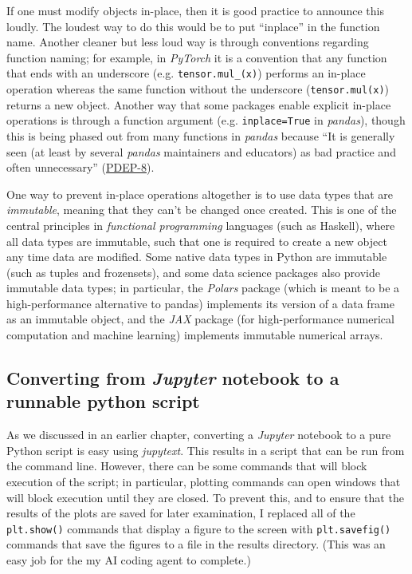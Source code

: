 If one must modify objects in-place, then it is good practice to announce this loudly.  The loudest way to do this would be to put ``inplace'' in the function name. Another cleaner but less loud way is through conventions regarding function naming; for example, in \textit{PyTorch} it is a convention that any function that ends with an underscore (e.g. \texttt{tensor.mul\_(x)}) performs an in-place operation whereas the same function without the underscore (\texttt{tensor.mul(x)}) returns a new object. Another way that some packages enable explicit in-place operations is through a function argument (e.g. \texttt{inplace=True} in \textit{pandas}), though this is being phased out from many functions in \textit{pandas} because ``It is generally seen (at least by several \textit{pandas} maintainers and educators) as bad practice and often unnecessary'' (\href{https://pandas.pydata.org/pdeps/0008-inplace-methods-in-pandas.html}{PDEP-8}).

One way to prevent in-place operations altogether is to use data types that are \textit{immutable}, meaning that they can't be changed once created.  This is one of the central principles in \textit{functional programming} languages (such as Haskell), where all data types are immutable, such that one is required to create a new object any time data are modified.  Some native data types in Python are immutable (such as tuples and frozensets), and some data science packages also provide immutable data types; in particular, the \textit{Polars} package (which is meant to be a high-performance alternative to pandas) implements its version of a data frame as an immutable object, and the \textit{JAX} package (for high-performance numerical computation and machine learning) implements immutable numerical arrays.

\subsection{Converting from \textit{Jupyter} notebook to a runnable python script}

As we discussed in an earlier chapter, converting a \textit{Jupyter} notebook to a pure Python script is easy using \textit{jupytext}.  This results in a script that can be run from the command line.  However, there can be some commands that will block execution of the script; in particular, plotting commands can open windows that will block execution until they are closed.  To prevent this, and to ensure that the results of the plots are saved for later examination, I replaced all of the \texttt{plt.show()} commands that display a figure to the screen with \texttt{plt.savefig()} commands that save the figures to a file in the results directory.  (This was an easy job for the my AI coding agent to complete.)

